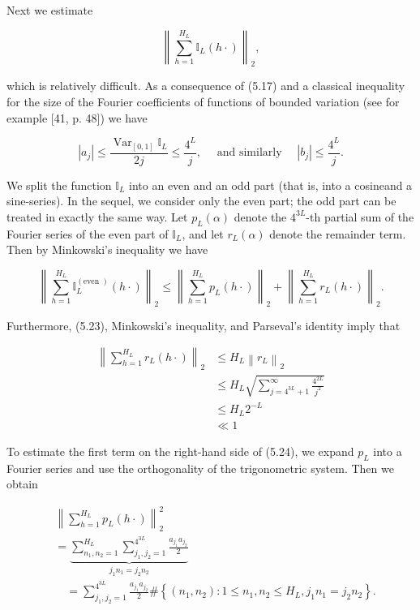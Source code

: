 \documentclass[10pt]{article}
\begin{document}
Next we estimate

$$
\left\|\sum_{h=1}^{H_{L}} \mathbb{I}_{L}(h \cdot)\right\|_{2},
$$

which is relatively difficult. As a consequence of (5.17) and a classical inequality for the size of the Fourier coefficients of functions of bounded variation (see for example [41, p. 48]) we have


\begin{equation*}
\left|a_{j}\right| \leqslant \frac{\operatorname{Var}_{[0,1]} \mathbb{I}_{L}}{2 j} \leqslant \frac{4^{L}}{j}, \quad \text { and similarly } \quad\left|b_{j}\right| \leqslant \frac{4^{L}}{j} . \tag{5.23}
\end{equation*}


We split the function $\mathbb{I}_{L}$ into an even and an odd part (that is, into a cosineand a sine-series). In the sequel, we consider only the even part; the odd part can be treated in exactly the same way. Let $p_{L}(\alpha)$ denote the $4^{3 L}$-th partial sum of the Fourier series of the even part of $\mathbb{I}_{L}$, and let $r_{L}(\alpha)$ denote the remainder term. Then by Minkowski's inequality we have


\begin{equation*}
\left\|\sum_{h=1}^{H_{L}} \mathbb{I}_{L}^{(\text {even })}(h \cdot)\right\|_{2} \leqslant\left\|\sum_{h=1}^{H_{L}} p_{L}(h \cdot)\right\|_{2}+\left\|\sum_{h=1}^{H_{L}} r_{L}(h \cdot)\right\|_{2} . \tag{5.24}
\end{equation*}


Furthermore, (5.23), Minkowski's inequality, and Parseval's identity imply that

$$
\begin{aligned}
\left\|\sum_{h=1}^{H_{L}} r_{L}(h \cdot)\right\|_{2} & \leqslant H_{L}\left\|r_{L}\right\|_{2} \\
& \leqslant H_{L} \sqrt{\sum_{j=4^{3 L}+1}^{\infty} \frac{4^{2 L}}{j^{2}}} \\
& \leqslant H_{L} 2^{-L} \\
& \ll 1
\end{aligned}
$$

To estimate the first term on the right-hand side of (5.24), we expand $p_{L}$ into a Fourier series and use the orthogonality of the trigonometric system. Then we obtain


\begin{align*}
& \left\|\sum_{h=1}^{H_{L}} p_{L}(h \cdot)\right\|_{2}^{2}  \tag{5.26}\\
& =\underbrace{\sum_{n_{1}, n_{2}=1}^{H_{L}} \sum_{j_{1}, j_{2}=1}^{4^{3 L}} \frac{a_{j_{1}} a_{j_{2}}}{2}}_{j_{1} n_{1}=j_{2} n_{2}} \\
& \quad=\sum_{j_{1}, j_{2}=1}^{4^{3 L}} \frac{a_{j_{1}} a_{j_{2}}}{2} \#\left\{\left(n_{1}, n_{2}\right): 1 \leqslant n_{1}, n_{2} \leqslant H_{L}, j_{1} n_{1}=j_{2} n_{2}\right\} .
\end{align*}
\end{document}
